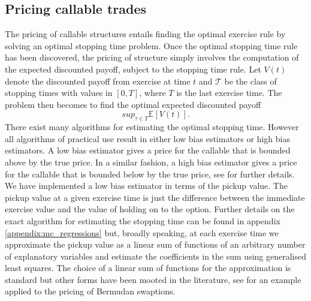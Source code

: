 \subsection{Pricing callable trades}
The pricing of callable structures entails finding the optimal
exercise rule by solving an optimal stopping time problem. Once the
optimal stopping time rule has been discovered, the pricing of
structure simply involves the computation of the expected discounted
payoff, subject to the stopping time rule. Let $V(t)$ denote the
discounted payoff from exercise at time $t$ and $\mathcal T$ be the
class of stopping times with values in $[0,T]$, where $T$ is the last
exercise time. The problem then becomes to find the optimal expected
discounted payoff
\begin{equation}
sup_{\tau \in T} \mathbb E[V(t)].
\end{equation}
There exist many algorithms for estimating the optimal stopping
time. However all algorithms of practical use result in either low
bias estimators or high bias estimators. A low bias estimator gives a
price for the callable that is bounded above by the true price. In a
similar fashion, a high bias estimator gives a price for the callable
that is bounded below by the true price, see \cite{book:GLASSERMAN}
for further details. We have implemented a low bias estimator in terms
of the pickup value. The pickup value at a given exercise time is just
the difference between the immediate exercise value and the value of
holding on to the option. Further details on the exact algorithm for
estimating the stopping time can be found in appendix
\ref{appendix:mc_regressions} but, broadly speaking, at each exercise
time we approximate the pickup value as a linear sum of functions of
an arbitrary number of explanatory variables and estimate the
coefficients in the sum using generalised least squares. The choice of
a linear sum of functions for the approximation is standard but other
forms have been mooted in the literature, see \cite{book:JAECKEL} for
an example applied to the pricing of Bermudan swaptions.

